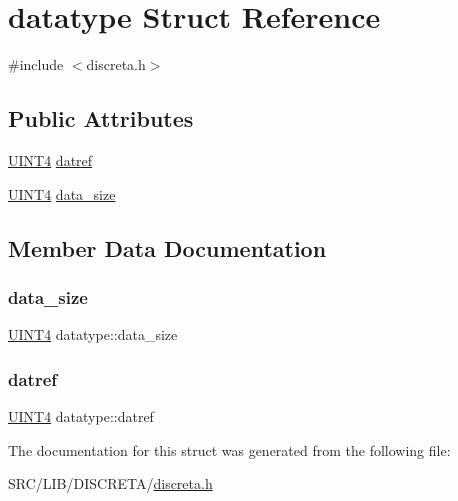 \hypertarget{structdatatype}{}\section{datatype Struct Reference}
\label{structdatatype}


{\ttfamily \#include $<$discreta.\+h$>$}

\subsection*{Public Attributes}
\begin{DoxyCompactItemize}
\item 
\mbox{\hyperlink{galois_8h_ac94af6544c710549c9fca744fd510395}{U\+I\+N\+T4}} \mbox{\hyperlink{structdatatype_abcb41c251ed293f616258a79ae021ebd}{datref}}
\item 
\mbox{\hyperlink{galois_8h_ac94af6544c710549c9fca744fd510395}{U\+I\+N\+T4}} \mbox{\hyperlink{structdatatype_abf2370537bda23fc96c273b5f1f30ee0}{data\+\_\+size}}
\end{DoxyCompactItemize}


\subsection{Member Data Documentation}
\mbox{\label{structdatatype_abf2370537bda23fc96c273b5f1f30ee0}} 
\subsubsection{\texorpdfstring{data\+\_\+size}{data\_size}}
{\footnotesize\ttfamily \mbox{\hyperlink{galois_8h_ac94af6544c710549c9fca744fd510395}{U\+I\+N\+T4}} datatype\+::data\+\_\+size}

\mbox{\label{structdatatype_abcb41c251ed293f616258a79ae021ebd}} 
\subsubsection{\texorpdfstring{datref}{datref}}
{\footnotesize\ttfamily \mbox{\hyperlink{galois_8h_ac94af6544c710549c9fca744fd510395}{U\+I\+N\+T4}} datatype\+::datref}



The documentation for this struct was generated from the following file\+:\begin{DoxyCompactItemize}
\item 
S\+R\+C/\+L\+I\+B/\+D\+I\+S\+C\+R\+E\+T\+A/\mbox{\hyperlink{discreta_8h}{discreta.\+h}}\end{DoxyCompactItemize}
